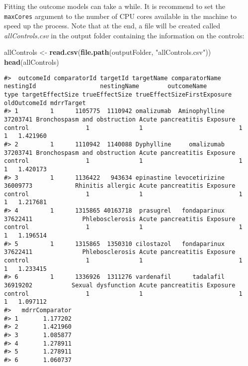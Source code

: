 \documentclass[]{article}
\newenvironment{Shaded}{\begin{snugshade}}{\end{snugshade}}
\newcommand{\KeywordTok}[1]{\textcolor[rgb]{0.13,0.29,0.53}{\textbf{#1}}}
\newcommand{\NormalTok}[1]{#1}
\newcommand{\StringTok}[1]{\textcolor[rgb]{0.31,0.60,0.02}{#1}}
\begin{document}
Fitting the outcome models can take a while. It is recommend to set the
\texttt{maxCores} argument to the number of CPU cores available in the
machine to speed up the process. Note that at the end, a file will be
created called \emph{allControls.csv} in the output folder containing
the information on the controls:

\begin{Shaded}
\begin{Highlighting}[]
\NormalTok{allControls <-}\StringTok{ }\KeywordTok{read.csv}\NormalTok{(}\KeywordTok{file.path}\NormalTok{(outputFolder, }\StringTok{"allControls.csv"}\NormalTok{))}
\KeywordTok{head}\NormalTok{(allControls)}
\end{Highlighting}
\end{Shaded}

\begin{verbatim}
#>  outcomeId comparatorId targetId targetName comparatorName nestingId                  nestingName        outcomeName             type targetEffectSize trueEffectSize trueEffectSizeFirstExposure oldOutcomeId mdrrTarget
#> 1         1      1105775  1110942 omalizumab  Aminophylline  37203741 Bronchospasm and obstruction Acute pancreatitis Exposure control                1              1                           1            1   1.421960
#> 2         1      1110942  1140088 Dyphylline     omalizumab  37203741 Bronchospasm and obstruction Acute pancreatitis Exposure control                1              1                           1            1   1.420173
#> 3         1      1136422   943634 epinastine levocetirizine  36009773            Rhinitis allergic Acute pancreatitis Exposure control                1              1                           1            1   1.217681
#> 4         1      1315865 40163718  prasugrel   fondaparinux  37622411              Phlebosclerosis Acute pancreatitis Exposure control                1              1                           1            1   1.196514
#> 5         1      1315865  1350310 cilostazol   fondaparinux  37622411              Phlebosclerosis Acute pancreatitis Exposure control                1              1                           1            1   1.233415
#> 6         1      1336926  1311276 vardenafil      tadalafil  36919202           Sexual dysfunction Acute pancreatitis Exposure control                1              1                           1            1   1.097112
#>   mdrrComparator
#> 1       1.177202
#> 2       1.421960
#> 3       1.085877
#> 4       1.278911
#> 5       1.278911
#> 6       1.060737
\end{verbatim}
\end{document}
